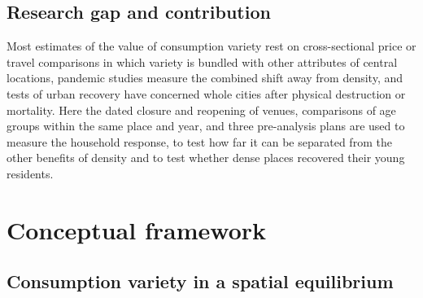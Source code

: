 \documentclass[11pt,a4paper]{article}
\begin{document}
\subsection{Research gap and contribution}

Most estimates of the value of consumption variety rest on cross-sectional price or travel comparisons in which variety is bundled with other attributes of central locations, pandemic studies measure the combined shift away from density, and tests of urban recovery have concerned whole cities after physical destruction or mortality. Here the dated closure and reopening of venues, comparisons of age groups within the same place and year, and three pre-analysis plans are used to measure the household response, to test how far it can be separated from the other benefits of density and to test whether dense places recovered their young residents.

\section{Conceptual framework}\label{sec:framework}

\subsection{Consumption variety in a spatial equilibrium}
\end{document}
